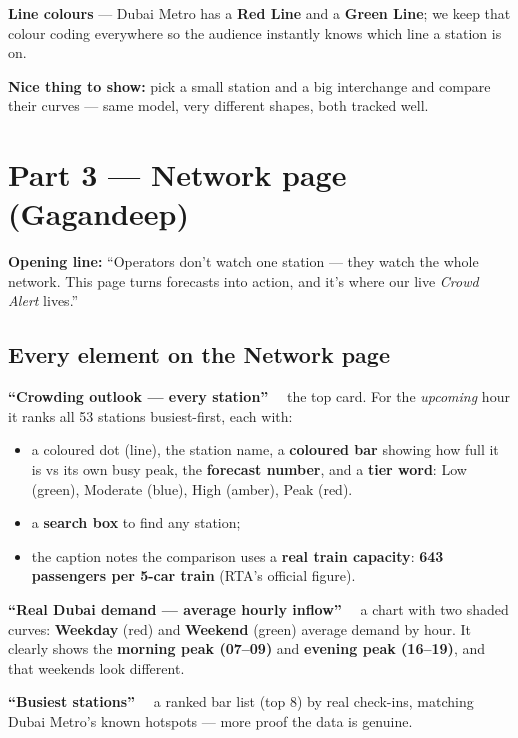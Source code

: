 \documentclass[11pt]{article}
\newcommand{\term}[1]{\noindent\textbf{\color{ink}#1} --- }
\newcommand{\elem}[1]{\smallskip\noindent\textbf{\color{metroRed}#1}\ \ }
\begin{document}
\term{Line colours} Dubai Metro has a \textbf{Red Line} and a \textbf{Green Line}; we keep that colour
coding everywhere so the audience instantly knows which line a station is on.

\textbf{Nice thing to show:} pick a small station and a big interchange and compare their curves ---
same model, very different shapes, both tracked well.

\section{Part 3 --- Network page \textnormal{(Gagandeep)}}
\textbf{Opening line:} ``Operators don't watch one station --- they watch the whole network. This page
turns forecasts into action, and it's where our live \emph{Crowd Alert} lives.''

\subsection{Every element on the Network page}
\elem{``Crowding outlook --- every station''} the top card. For the \emph{upcoming} hour it ranks all
53 stations busiest-first, each with:
\begin{itemize}
  \item a coloured dot (line), the station name, a \textbf{coloured bar} showing how full it is vs its
        own busy peak, the \textbf{forecast number}, and a \textbf{tier word}: Low (green),
        Moderate (blue), High (amber), Peak (red).
  \item a \textbf{search box} to find any station;
  \item the caption notes the comparison uses a \textbf{real train capacity}: \textbf{643 passengers
        per 5-car train} (RTA's official figure).
\end{itemize}

\elem{``Real Dubai demand --- average hourly inflow''} a chart with two shaded curves: \textbf{Weekday}
(red) and \textbf{Weekend} (green) average demand by hour. It clearly shows the \textbf{morning peak
(07--09)} and \textbf{evening peak (16--19)}, and that weekends look different.

\elem{``Busiest stations''} a ranked bar list (top 8) by real check-ins, matching Dubai Metro's known
hotspots --- more proof the data is genuine.
\end{document}
